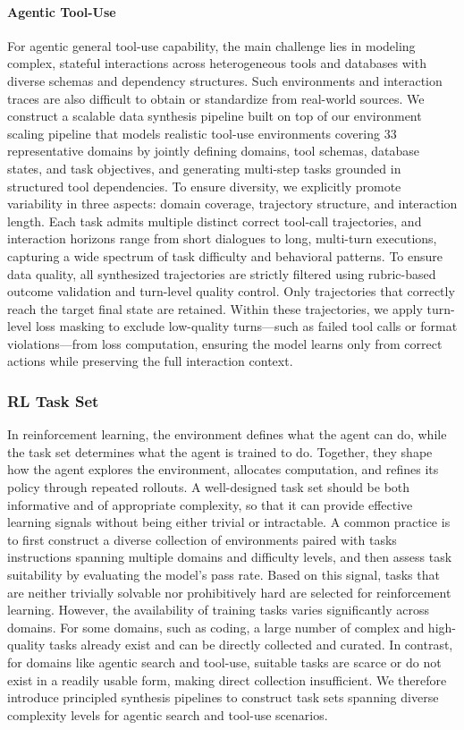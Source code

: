 \documentclass{article}
\begin{document}
\paragraph{Agentic Tool-Use}
For agentic general tool-use capability, the main challenge lies in modeling complex, stateful interactions across heterogeneous tools and databases with diverse schemas and dependency structures. 
Such environments and interaction traces are also difficult to obtain or standardize from real-world sources.
We construct a scalable data synthesis pipeline built on top of our environment scaling pipeline that models realistic tool-use environments covering 33 representative domains by jointly defining domains, tool schemas, database states, and task objectives, and generating multi-step tasks grounded in structured tool dependencies.
To ensure diversity, we explicitly promote variability in three aspects: domain coverage, trajectory structure, and interaction length.
Each task admits multiple distinct correct tool-call trajectories, and interaction horizons range from short dialogues to long, multi-turn executions, capturing a wide spectrum of task difficulty and behavioral patterns.
To ensure data quality, all synthesized trajectories are strictly filtered using rubric-based outcome validation and turn-level quality control.
Only trajectories that correctly reach the target final state are retained. 
Within these trajectories, we apply turn-level loss masking to exclude low-quality turns—such as failed tool calls or format violations—from loss computation, ensuring the model learns only from correct actions while preserving the full interaction context.


\subsubsection{RL Task Set}
\label{sec:post_training_problem_set}

In reinforcement learning, the environment defines what the agent can do, while the task set determines what the agent is trained to do. Together, they shape how the agent explores the environment, allocates computation, and refines its policy through repeated rollouts.
A well-designed task set should be both informative and of appropriate complexity, so that it can provide effective learning signals without being either trivial or intractable.
A common practice is to first construct a diverse collection of environments paired with tasks instructions spanning multiple domains and difficulty levels, and then assess task suitability by evaluating the model’s pass rate. Based on this signal, tasks that are neither trivially solvable nor prohibitively hard are selected for reinforcement learning.
However, the availability of training tasks varies significantly across domains.
For some domains, such as coding, a large number of complex and high-quality tasks already exist and can be directly collected and curated.
In contrast, for domains like agentic search and tool-use, suitable tasks are scarce or do not exist in a readily usable form, making direct collection insufficient.
We therefore introduce principled synthesis pipelines to construct task sets spanning diverse complexity levels for agentic search and tool-use scenarios.
\end{document}

